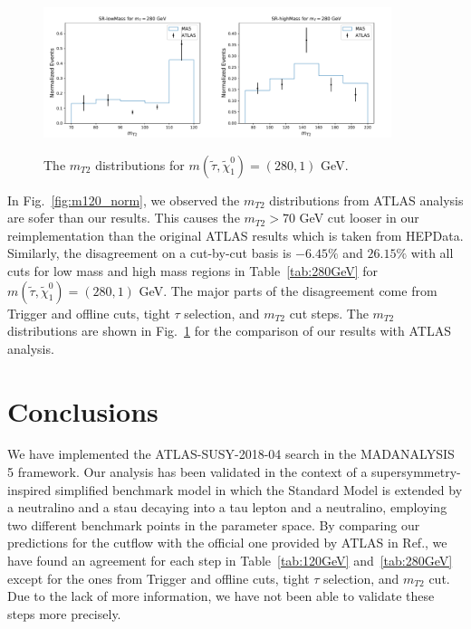 \documentclass{ws-mpla}
\begin{document}
\begin{figure}[t]
  \centerline{\includegraphics[width=2.0in]{m280_norm_1}\includegraphics[width=2.0in]{m280_norm_2}}
  \vspace*{8pt}
  \caption{The $m_{T2}$ distributions for $m(\tilde{\tau},\tilde{\chi}^0_1)=(280,1)$ GeV.\protect\label{fig:m280_norm}}
\end{figure}
In Fig.~\ref{fig:m120_norm}, we {\color{blue}observed} the $m_{T2}$ distributions from ATLAS analysis are sofer than our results. This causes the $m_{T2} > 70$ GeV cut looser in our reimplementation than the original ATLAS results which is taken from HEPData\cite{hepdata}.
Similarly, the disagreement on a cut-by-cut basis is $-6.45\%$ and $26.15\%$ with all cuts 
for low mass and high mass regions in Table~\ref{tab:280GeV} for $m(\tilde{\tau},\tilde{\chi}^0_1)=(280,1)$ GeV. The major parts of the disagreement come from Trigger and offline cuts, tight $\tau$ selection, and $m_{T2}$ cut steps. 
The $m_{T2}$ distributions are shown in Fig.~\ref{fig:m280_norm} for the comparison of our results with ATLAS analysis. 


\section{Conclusions}

We have implemented the ATLAS-SUSY-2018-04 search in the MADANALYSIS 5 framework. Our analysis has been validated in the context of a supersymmetry-inspired simplified benchmark model in which the Standard Model is extended by a neutralino and a stau decaying into a tau lepton and a neutralino, employing two different benchmark points in the parameter space.
By comparing our predictions for the cutflow with the official one provided by ATLAS in Ref.\cite{Aad:2019byo}, we have found an agreement for each step in Table~\ref{tab:120GeV} and~\ref{tab:280GeV} except for the ones from Trigger and offline cuts, tight $\tau$ selection, and $m_{T2}$ cut. Due to the lack of more information, we have not been able to validate these steps more precisely. 
\end{document}
